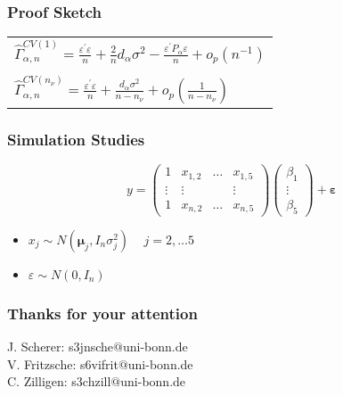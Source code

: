 \documentclass[20pt,mathserif]{beamer}
\begin{document}
\begin{frame}
\frametitle{Proof Sketch}
\setlength{\tabcolsep}{1pt}
\begin{tabular}{l}
$\hat{\Gamma}^{CV(1)}_{\alpha,n}=\frac{\varepsilon^\prime\varepsilon}{n}+\frac{2}{n}d_\alpha\sigma^2-\frac{\varepsilon^\prime P_\alpha\varepsilon}{n}+o_p(n^{-1})$\\\\
$\hat{\Gamma}^{CV(n_\nu)}_{\alpha,n}=\frac{\varepsilon^\prime\varepsilon}{n}+\frac{d_\alpha\sigma^2}{n-n_\nu}+o_p\left(\frac{1}{n-n_\nu}\right)$
\end{tabular}
\end{frame}

\begin{frame}
\frametitle{Simulation Studies}
\begin{equation*}
y =\begin{pmatrix}
1 & x_{1,2} & \ldots & x_{1,5}\\
\vdots & \vdots& & \vdots\\
1& x_{n,2} &\ldots & x_{n,5}
\end{pmatrix}
\begin{pmatrix}
\beta_1\\
\vdots\\
\beta_5
\end{pmatrix}
+\mathbf{{\varepsilon}}
\end{equation*}
\begin{itemize}
	\item $x_{j} \sim N(\mathbf{{\mu}}_j,{I}_n\sigma^2_j)$ ~  $ j=2,\ldots5$
	\item $\varepsilon \sim N(0,{I}_n)$
\end{itemize}
\end{frame}

\begin{frame}
\frametitle{Thanks for your attention }
J. Scherer: s3jnsche$@$uni-bonn.de\\
V. Fritzsche: s6vifrit$@$uni-bonn.de\\
C. Zilligen: s3chzill$@$uni-bonn.de

\end{frame}
\end{document}
